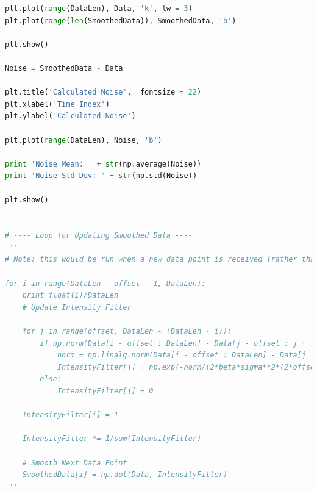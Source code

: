 \documentclass[11pt]{article}
\theoremstyle{definition}
\begin{document}
\begin{lstlisting}[language = Python]
plt.plot(range(DataLen), Data, 'k', lw = 3)
plt.plot(range(len(SmoothedData)), SmoothedData, 'b')

plt.show()

Noise = SmoothedData - Data

plt.title('Calculated Noise',  fontsize = 22)
plt.xlabel('Time Index')
plt.ylabel('Calculated Noise')

plt.plot(range(DataLen), Noise, 'b')

print 'Noise Mean: ' + str(np.average(Noise))
print 'Noise Std Dev: ' + str(np.std(Noise))

plt.show()


# ---- Loop for Updating Smoothed Data ----
'''
# Note: this would be run when a new data point is received (rather than re-running the whole function for all data)

for i in range(DataLen - offset - 1, DataLen):
    print float(i)/DataLen
    # Update Intensity Filter

    for j in range(offset, DataLen - (DataLen - i)):
        if np.norm(Data[i - offset : DataLen] - Data[j - offset : j + (DataLen - i)]) < thresh:
            norm = np.linalg.norm(Data[i - offset : DataLen] - Data[j - offset : j + (DataLen - i)])**2
            IntensityFilter[j] = np.exp(-norm/(2*beta*sigma**2*(2*offset + 1)))
        else:
            IntensityFilter[j] = 0

    IntensityFilter[i] = 1

    IntensityFilter *= 1/sum(IntensityFilter)

    # Smooth Next Data Point
    SmoothedData[i] = np.dot(Data, IntensityFilter)
'''


\end{lstlisting}
\end{document}
